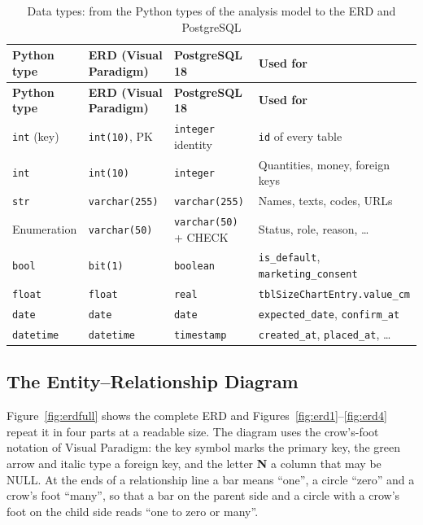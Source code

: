 {\small
\begin{xltabular}{\textwidth}{@{}L{3.4cm} L{3.4cm} L{3.2cm} Y@{}}
\caption{Data types: from the Python types of the analysis model to the ERD and PostgreSQL}\label{tab:typemapping}\\
\toprule
\textbf{Python type} & \textbf{ERD (Visual Paradigm)} & \textbf{PostgreSQL 18} & \textbf{Used for} \\ \midrule
\endfirsthead
\toprule
\textbf{Python type} & \textbf{ERD (Visual Paradigm)} & \textbf{PostgreSQL 18} & \textbf{Used for} \\ \midrule
\endhead
\bottomrule
\endlastfoot
\texttt{int} (key) & \texttt{int(10)}, PK & \texttt{integer} identity & \texttt{id} of every table \\
\texttt{int} & \texttt{int(10)} & \texttt{integer} & Quantities, money, foreign keys \\
\texttt{str} & \texttt{varchar(255)} & \texttt{varchar(255)} & Names, texts, codes, URLs \\
Enumeration & \texttt{varchar(50)} & \texttt{varchar(50)} + CHECK & Status, role, reason, \ldots \\
\texttt{bool} & \texttt{bit(1)} & \texttt{boolean} & \texttt{is\_default}, \texttt{marketing\_consent} \\
\texttt{float} & \texttt{float} & \texttt{real} & \texttt{tblSizeChartEntry.\allowbreak value\_cm} \\
\texttt{date} & \texttt{date} & \texttt{date} & \texttt{expected\_date}, \texttt{confirm\_at} \\
\texttt{datetime} & \texttt{datetime} & \texttt{timestamp} & \texttt{created\_at}, \texttt{placed\_at}, \ldots \\
\end{xltabular}
}

\subsection{The Entity--Relationship Diagram}
\label{subsec:erd}
Figure~\ref{fig:erdfull} shows the complete ERD and Figures~\ref{fig:erd1}--\ref{fig:erd4} repeat it in four parts at a readable size. The diagram uses the crow's-foot notation of Visual Paradigm: the key symbol marks the primary key, the green arrow and italic type a foreign key, and the letter \textbf{N} a column that may be NULL. At the ends of a relationship line a bar means ``one'', a circle ``zero'' and a crow's foot ``many'', so that a bar on the parent side and a circle with a crow's foot on the child side reads ``one to zero or many''.

